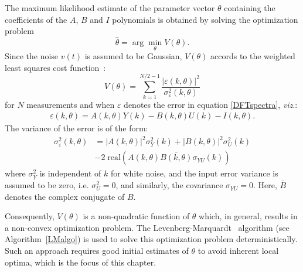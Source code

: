 The maximum likelihood estimate of the parameter vector $\theta$  containing the coefficients of the $A$, $B$ and $I$  polynomials is obtained by solving the optimization problem
\begin{equation}
  \hat{\theta} = \arg\min_\theta V(\theta) \text{.}
\end{equation}
Since the noise $v(t)$ is assumed to be Gaussian, $V(\theta)$ accords to the weighted least squares cost function~\citep[Section 9.11]{Pintelon2012}:
\begin{equation}\label{eq:MLEcf}
V(\theta) = \sum_{k=1}^{N/2-1}\frac{|\varepsilon(k,\theta)|^2}{\sigma_\varepsilon^2(k,\theta)}
\end{equation}
for $N$ measurements and when $\varepsilon$ denotes the error in equation \eqref{DFTspectra},  \emph{viz}.:
\begin{align}
\varepsilon(k,\theta) = A(k,\theta)Y(k) - B(k,\theta)U(k) - I(k,\theta)\text{.}
\end{align}
The variance of the error is of the form:
\begin{equation}\label{eq:sigmaEps}
\begin{split}
\sigma_\varepsilon^2(k,\theta) 
  &=  |A(k,\theta)|^2\sigma_Y^2(k) 
   +  |B(k,\theta)|^2\sigma_U^2(k) \\
  &- 2\;\mathrm{real} \left( A(k,\theta) \overline{B(k,\theta)} \sigma_{YU}(k) \right)
\end{split}
\end{equation}
where $\sigma_Y^2$ is independent of $k$ for white noise, %
and the input error variance is assumed to be zero, i.e. $\sigma^2_U=0$, and similarly, the covariance $\sigma_{YU} = 0$.
Here, $\overline{B}$ denotes the complex conjugate of $B$.

Consequently, $V(\theta)$ is a non-quadratic function of $\theta$ which, in general, results in a non-convex optimization problem. 
The Levenberg-Marquardt~\citep{Marquardt1963} algorithm (see Algorithm~\ref{LMalgo}) is used to solve this optimization problem deterministically.
Such an approach requires good initial estimates of $\theta$ to avoid inherent local optima, which is the focus of this chapter.

